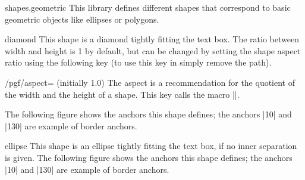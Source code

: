 \begin{pgflibrary}{shapes.geometric}
  This library defines different shapes that correspond to basic
  geometric objects like ellipses or polygons.
\end{pgflibrary}


\begin{shape}{diamond}
  This shape is a diamond tightly fitting the text box. The ratio
  between width and height is 1 by default, but can be changed by
  setting the shape aspect ratio using the following \pgfname{}
  key (to use this key in \tikzname{} simply remove the
   path).

  \begin{key}{/pgf/aspect= (initially 1.0)}
    The aspect is a recommendation for the quotient of the width and
    the height of a shape. This key calls the macro
    |\pgfsetshapeaspect|.
  \end{key}

  The following figure shows the anchors this
  shape defines; the anchors |10| and |130| are example of border
  anchors.

\begin{codeexample}[]
\Huge
{}
\end{codeexample}
\end{shape}

\begin{shape}{ellipse}
  This shape is an ellipse tightly fitting the text box, if no inner
  separation is given. The following figure shows the anchors this
  shape defines; the anchors |10| and |130| are example of border anchors.
\begin{codeexample}[]
\Huge
{}
\end{codeexample}
\end{shape}





